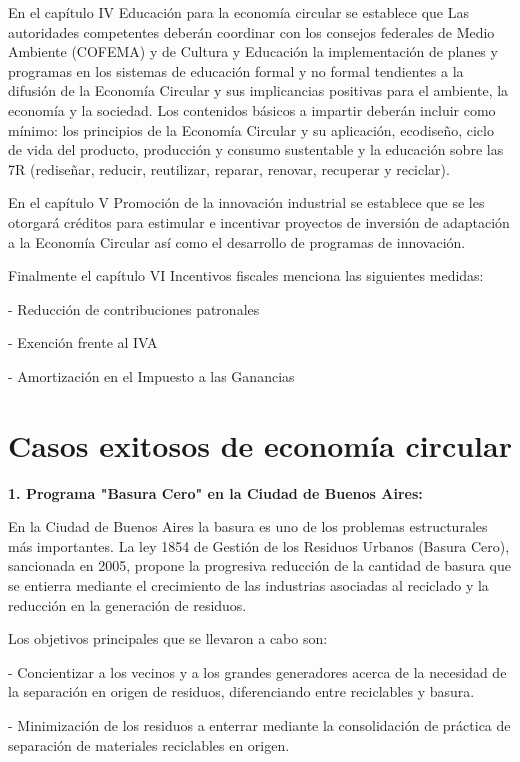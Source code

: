 \documentclass[runningheads]{llncs}
\begin{document}
En el capítulo IV Educación para la economía circular se establece que Las autoridades competentes deberán coordinar con los consejos federales de Medio Ambiente (COFEMA) y de Cultura y Educación la implementación de planes y programas en los sistemas de educación formal y no formal tendientes a la difusión de la Economía Circular y sus implicancias positivas para el ambiente, la economía y la sociedad. Los contenidos básicos a impartir deberán incluir como mínimo: los principios de la Economía Circular y su aplicación, ecodiseño, ciclo de vida del producto, producción y consumo sustentable y la educación sobre las 7R (rediseñar, reducir, reutilizar, reparar, renovar, recuperar y reciclar).

En el capítulo V Promoción de la innovación industrial se establece que se les otorgará créditos para estimular e incentivar proyectos de inversión de adaptación a la Economía Circular así como el desarrollo de programas de innovación.

Finalmente el capítulo VI Incentivos fiscales menciona las siguientes medidas:

- Reducción de contribuciones patronales

- Exención frente al IVA

- Amortización en el Impuesto a las Ganancias

\section{Casos exitosos de economía circular}

\hspace{0.5cm} \textbf{1. Programa "Basura Cero" en la Ciudad de Buenos Aires:}

En la Ciudad de Buenos Aires la basura es uno de los problemas estructurales más importantes. La ley 1854 de Gestión de los Residuos Urbanos (Basura Cero), sancionada en 2005, propone la progresiva reducción de la cantidad de basura que se entierra mediante el crecimiento de las industrias asociadas al reciclado y la reducción en la generación de residuos.

Los objetivos principales que se llevaron a cabo son: 

- Concientizar a los vecinos y a los grandes generadores acerca de la necesidad de la separación en origen de residuos, diferenciando entre reciclables y basura.

- Minimización de los residuos a enterrar mediante la consolidación de práctica de separación de materiales reciclables en origen.
\end{document}
